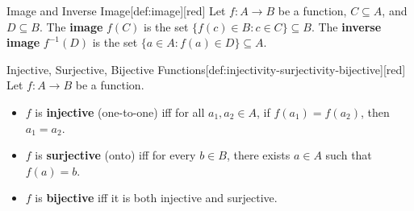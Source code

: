 \begin{define}{Image and Inverse Image}[def:image][red]
  Let $f : A \to B$ be a function, $C\subseteq A$, and $D\subseteq B$. 
  The \textbf{image} $f(C)$ is the set $\{f(c) \in B : c \in C\} \subseteq B$.
  The \textbf{inverse image} $f^{-1}(D)$ is the set $\{a \in A : f(a) \in D\} \subseteq A$.
\end{define}

\begin{define}{Injective, Surjective, Bijective Functions}[def:injectivity-surjectivity-bijective][red]
  Let $f : A \to B$ be a function.
  \begin{itemize}
    \item $f$ is \textbf{injective} (one-to-one) iff for all $a_1, a_2 \in A$, if $f(a_1) = f(a_2)$, then $a_1 = a_2$.
    \item $f$ is \textbf{surjective} (onto) iff for every $b \in B$, there exists $a \in A$ such that $f(a) = b$.
    \item $f$ is \textbf{bijective} iff it is both injective and surjective.
  \end{itemize}
\end{define}


